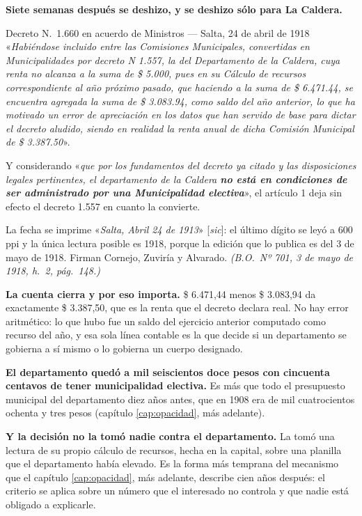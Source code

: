 \textbf{Siete semanas después se deshizo, y se deshizo sólo para La Caldera.}

\begin{ficha}{Decreto N.\ 1.660 en acuerdo de Ministros --- Salta, 24 de abril de 1918}
«\textit{Habiéndose incluido entre las Comisiones Municipales, convertidas en Municipalidades
por decreto N 1.557, la del Departamento de la Caldera, cuya renta no alcanza a la suma de \$
5.000, pues en su Cálculo de recursos correspondiente al año próximo pasado, que haciendo a la
suma de \$ 6.471.44, se encuentra agregada la suma de \$ 3.083.94, como saldo del año anterior,
lo que ha motivado un error de apreciación en los datos que han servido de base para dictar el
decreto aludido, siendo en realidad la renta anual de dicha Comisión Municipal de \$ 3.387.50}».

Y considerando «\textit{que por los fundamentos del decreto ya citado y las disposiciones legales
pertinentes, el departamento de la Caldera \textbf{no está en condiciones de ser administrado por
una Municipalidad electiva}}», el artículo 1 deja sin efecto el decreto 1.557 en cuanto la
convierte.

La fecha se imprime «\textit{Salta, Abril 24 de 1913}» [\textit{sic}]: el último dígito se leyó a
600 ppi y la única lectura posible es 1918, porque la edición que lo publica es del 3 de mayo de
1918. Firman Cornejo, Zuviría y Alvarado.
\textit{(B.O.\ Nº 701, 3 de mayo de 1918, h.\ 2, pág.\ 148.)}
\end{ficha}

\begin{cautela}
\textbf{La cuenta cierra y por eso importa.} \$ 6.471,44 menos \$ 3.083,94 da exactamente \$
3.387,50, que es la renta que el decreto declara real. No hay error aritmético: lo que hubo fue
un saldo del ejercicio anterior computado como recurso del año, y esa sola línea contable es la
que decide si un departamento se gobierna a sí mismo o lo gobierna un cuerpo designado.

\textbf{El departamento quedó a mil seiscientos doce pesos con cincuenta centavos de tener
municipalidad electiva.} Es más que todo el presupuesto municipal del departamento diez años
antes, que en 1908 era de mil cuatrocientos ochenta y tres pesos (capítulo \ref{cap:opacidad}, más adelante).

\textbf{Y la decisión no la tomó nadie contra el departamento.} La tomó una lectura de su propio
cálculo de recursos, hecha en la capital, sobre una planilla que el departamento había elevado.
Es la forma más temprana del mecanismo que el capítulo \ref{cap:opacidad}, más adelante, describe cien años
después: el criterio se aplica sobre un número que el interesado no controla y que nadie está
obligado a explicarle.
\end{cautela}

